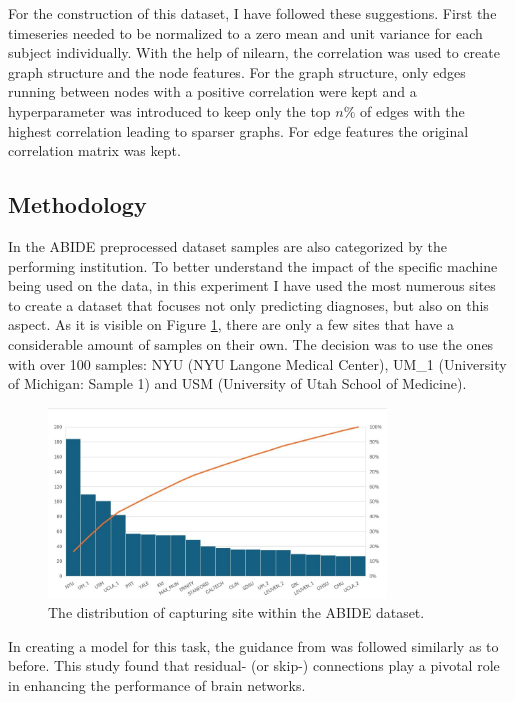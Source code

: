 	For the construction of this dataset, I have followed these suggestions. First the timeseries needed to be normalized to a zero mean and unit variance for each subject individually. With the help of nilearn, the correlation was used to create graph structure and the node features. For the graph structure, only edges running between nodes with a positive correlation were kept and a hyperparameter was introduced to keep only the top $n\%$ of edges with the highest correlation leading to sparser graphs. For edge features the original correlation matrix was kept.
	
	\subsection{Methodology}
	
	In the ABIDE preprocessed dataset samples are also categorized by the performing institution. To better understand the impact of the specific machine being used on the data, in this experiment I have used the most numerous sites to create a dataset that focuses not only predicting diagnoses, but also on this aspect. As it is visible on Figure \ref{fig:distribution}, there are only a few sites that have a considerable amount of samples on their own. The decision was to use the ones with over 100 samples: NYU (NYU Langone Medical Center), UM\_1 (University of Michigan: Sample 1) and USM (University of Utah School of Medicine).
	
	\begin{figure}[!h]
		\centering
		\label{fig:distribution}
		\includegraphics[width=0.8\textwidth]{figures/ABIDE-sites.jpg}
		\caption{The distribution of capturing site within the ABIDE dataset.}
	\end{figure}
	
	In creating a model for this task, the guidance from \cite{said2023neurograph} was followed similarly as to before. This study found that residual- (or skip-) connections play a pivotal role in enhancing the performance of brain networks.
	
